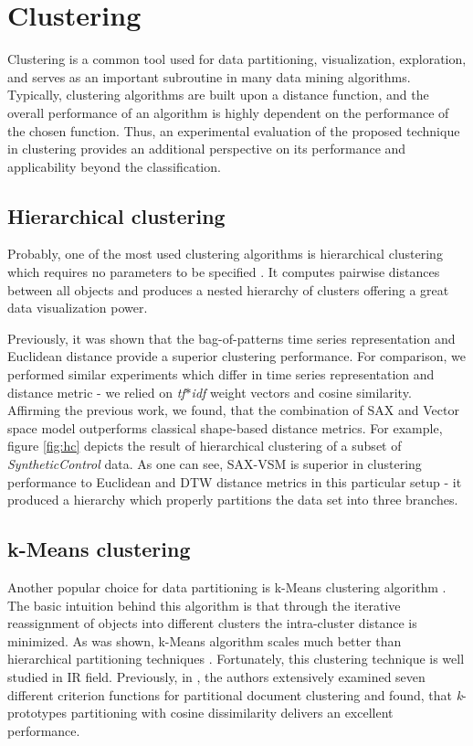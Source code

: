 \documentclass[conference]{IEEEtran}
\begin{document}
\section{Clustering}
Clustering is a common tool used for data partitioning, visualization, exploration, and serves as
an important subroutine in many data mining algorithms. Typically, clustering algorithms
are built upon a distance function, and the overall performance of an algorithm is highly
dependent on the performance of the chosen function. Thus, an experimental evaluation of the 
proposed technique in clustering provides an additional perspective on its performance and
applicability beyond the classification.

\subsection{Hierarchical clustering}
Probably, one of the most used clustering algorithms is hierarchical clustering which requires no
parameters to be specified \cite{hcs}. It computes pairwise distances between all objects and 
produces a nested hierarchy of clusters offering a great data visualization power. 

Previously, it was shown that the bag-of-patterns time series representation and Euclidean distance
provide a superior clustering performance\cite{bag_patterns}. 
For comparison, we performed similar experiments which differ in time series representation and
distance metric - we relied on \textit{tf$\ast$idf} weight vectors and cosine similarity. 
Affirming the previous work, we found, that the combination of SAX and Vector space model
outperforms classical shape-based distance metrics. 
For example, figure \ref{fig:hc} depicts the result of hierarchical clustering of a subset of
\textit{SyntheticControl} data. 
As one can see, SAX-VSM is superior in clustering performance to Euclidean and DTW distance 
metrics in this particular setup - it produced a hierarchy which properly partitions the
data set into three branches.

\subsection{k-Means clustering}
Another popular choice for data partitioning is k-Means clustering algorithm \cite{kmeans}.
The basic intuition behind this algorithm is that through the iterative reassignment of objects 
into different clusters the intra-cluster distance is minimized. As was shown, k-Means 
algorithm scales much better than hierarchical partitioning techniques \cite{kscale}.
Fortunately, this clustering technique is well studied in IR field. Previously, in \cite{zhao}, the
authors extensively examined seven different criterion functions for partitional document
clustering and found, that \textit{k}-prototypes partitioning with cosine dissimilarity delivers an
excellent performance. 
\end{document}
